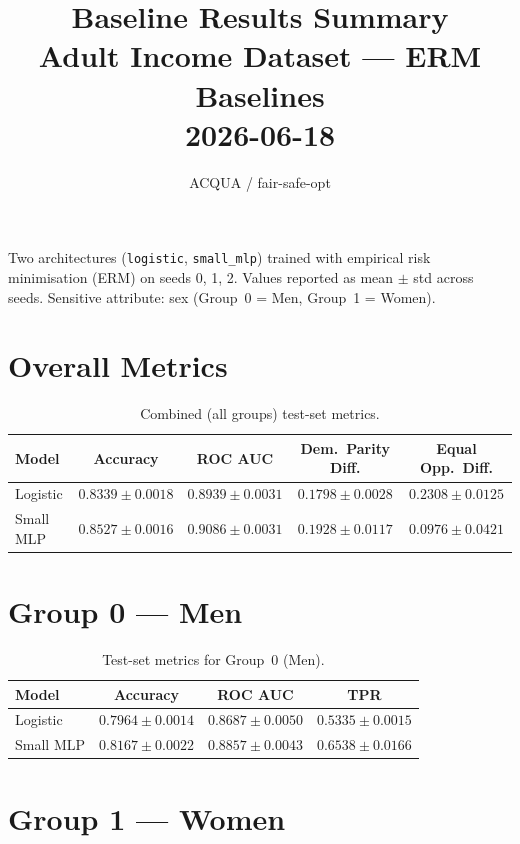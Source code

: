 \documentclass[11pt]{article}
\title{\textbf{Baseline Results Summary}\\[0.4em]
       \large Adult Income Dataset --- ERM Baselines\\
       \normalsize 2026-06-18}
\author{ACQUA / fair-safe-opt}
\date{}
\begin{document}
\maketitle

\noindent
Two architectures (\texttt{logistic}, \texttt{small\_mlp}) trained with empirical risk minimisation (ERM) on seeds 0, 1, 2.
Values reported as mean $\pm$ std across seeds.
Sensitive attribute: sex (Group~0 = Men, Group~1 = Women).

\section*{Overall Metrics}

\begin{table}[h]
\centering
\caption{Combined (all groups) test-set metrics.}
\begin{tabular}{lcccc}
\toprule
Model & Accuracy & ROC AUC & Dem.\ Parity Diff. & Equal Opp.\ Diff. \\
\midrule
Logistic   & $0.8339 \pm 0.0018$ & $0.8939 \pm 0.0031$ & $0.1798 \pm 0.0028$ & $0.2308 \pm 0.0125$ \\
Small MLP  & $0.8527 \pm 0.0016$ & $0.9086 \pm 0.0031$ & $0.1928 \pm 0.0117$ & $0.0976 \pm 0.0421$ \\
\bottomrule
\end{tabular}
\end{table}

\section*{Group 0 --- Men}

\begin{table}[h]
\centering
\caption{Test-set metrics for Group~0 (Men).}
\begin{tabular}{lccc}
\toprule
Model & Accuracy & ROC AUC & TPR \\
\midrule
Logistic   & $0.7964 \pm 0.0014$ & $0.8687 \pm 0.0050$ & $0.5335 \pm 0.0015$ \\
Small MLP  & $0.8167 \pm 0.0022$ & $0.8857 \pm 0.0043$ & $0.6538 \pm 0.0166$ \\
\bottomrule
\end{tabular}
\end{table}

\section*{Group 1 --- Women}
\end{document}
